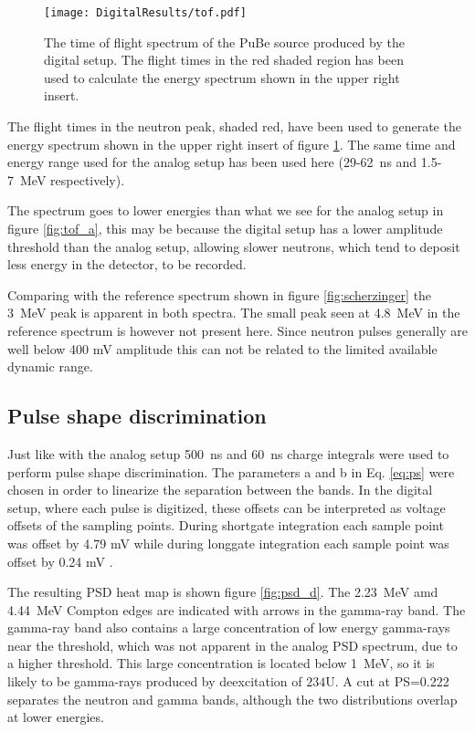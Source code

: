 \documentclass[main.tex]{subfiles}
\begin{document}
\begin{figure}[ht]
    \centering
        \texttt{[image: DigitalResults/tof.pdf]}
        \caption[Time of flight spectrum, digital setup.]{The time of flight spectrum of the PuBe source produced by the digital setup. The flight times in the red shaded region has been used to calculate the energy spectrum shown in the upper right insert.}
    \label{fig:tof_d} 
\end{figure}

The flight times in the neutron peak, shaded red, have been used to generate the energy spectrum shown in the upper right insert of figure \ref{fig:tof_d}. The same time and energy range used for the analog setup has been used here (29-\SI{62}{\ns} and 1.5-\SI{7}{\MeV} respectively). 

The spectrum goes to lower energies than what we see for the analog setup in figure \ref{fig:tof_a}, this may be because the digital setup has a lower amplitude threshold than the analog setup, allowing slower neutrons, which tend to deposit less energy in the detector, to be recorded.

Comparing with the reference spectrum shown in figure \ref{fig:scherzinger} the  \SI{3}{MeV} peak is apparent in both spectra. The small peak seen at \SI{4.8}{MeV} in the reference spectrum is however not present here. Since neutron pulses generally are well below 400 mV amplitude this can not be related to the limited available dynamic range.

\subsection{Pulse shape discrimination}
Just like with the analog setup \SI{500}{ns} and \SI{60}{ns} charge integrals were used to perform pulse shape discrimination. The parameters a and b in Eq. \ref{eq:ps} were chosen in order to linearize the separation between the bands. In the digital setup, where each pulse is digitized, these offsets can be interpreted as voltage offsets of the sampling points. During shortgate integration each sample point was offset by 4.79 mV while during longgate integration each sample point was offset by 0.24 mV .

The resulting PSD heat map is shown figure \ref{fig:psd_d}. The \SI{2.23}{\MeV} amd \SI{4.44}{MeV} Compton edges are indicated with arrows in the gamma-ray band. The gamma-ray band also contains a large concentration of low energy gamma-rays near the threshold, which was not apparent in the analog PSD spectrum, due to a higher threshold. This large concentration is located below \SI{1}{MeV}, so it is likely to be gamma-rays produced by deexcitation of $\text{234}$U.
A cut at PS=0.222 separates the neutron and gamma bands, although the two distributions overlap at lower energies.
\end{document}
